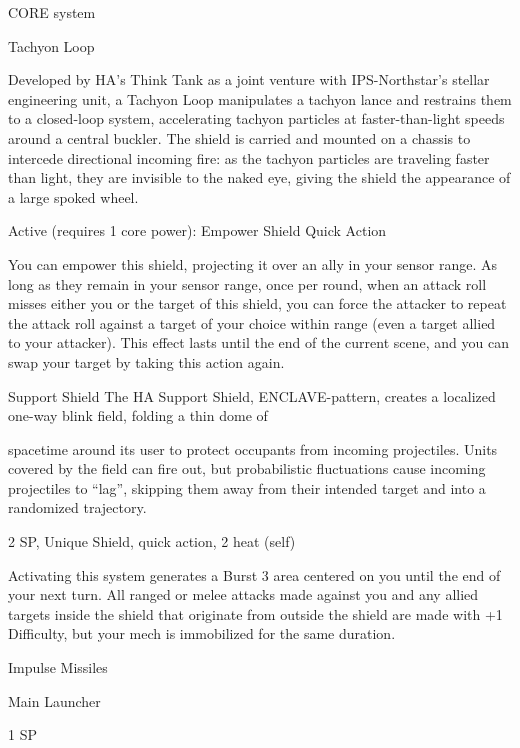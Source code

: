                                                 CORE system 

                                                                                                             


                                                  Tachyon Loop
 
 Developed by HA’s Think Tank as a joint venture with IPS-Northstar’s stellar engineering unit, a Tachyon  
 Loop manipulates a tachyon lance and restrains them to a closed-loop system, accelerating tachyon  
 particles at faster-than-light speeds around a central buckler. The shield is carried and mounted on a  
 chassis to intercede directional incoming fire: as the tachyon particles are traveling faster than light, they  
 are invisible to the naked eye, giving the shield the appearance of a large spoked wheel.   

 Active (requires 1 core power): Empower Shield  
 Quick Action
 
 You can empower this shield, projecting it over an ally in your sensor range. As long as they remain in  
 your sensor range, once per round, when an attack roll misses either you or the target of this shield,  
 you can force the attacker to repeat the attack roll against a target of your choice within range (even a  
 target allied to your attacker). This effect lasts until the end of the current scene, and you can swap  
 your target by taking this action again. 

Support Shield  
The HA Support Shield, ENCLAVE-pattern, creates a localized one-way blink field, folding a thin dome of  

spacetime around its user to protect occupants from incoming projectiles. Units covered by the field can  
fire out, but probabilistic fluctuations cause incoming projectiles to “lag”, skipping them away from their  
intended target and into a randomized trajectory.   

2 SP, Unique  
Shield, quick action, 2 heat (self)
 

Activating this system generates a Burst 3 area centered on you until the end of your next turn.  
All ranged or melee attacks made against you and any allied targets inside the shield that  
originate from outside the shield are made with +1 Difficulty, but your mech is immobilized for the  
same duration.
 

Impulse Missiles  

Main Launcher
 
1 SP
 
